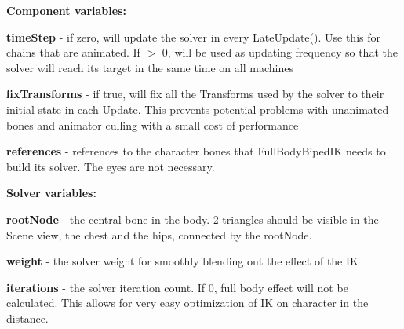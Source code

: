 {\bfseries Component variables\+:}
\begin{DoxyItemize}
\item {\bfseries time\+Step} -\/ if zero, will update the solver in every Late\+Update(). Use this for chains that are animated. If $>$ 0, will be used as updating frequency so that the solver will reach its target in the same time on all machines
\item {\bfseries fix\+Transforms} -\/ if true, will fix all the Transforms used by the solver to their initial state in each Update. This prevents potential problems with unanimated bones and animator culling with a small cost of performance
\item {\bfseries references} -\/ references to the character bones that Full\+Body\+Biped\+IK needs to build it\textquotesingle{}s solver. The eyes are not necessary.
\end{DoxyItemize}

{\bfseries Solver variables\+:}
\begin{DoxyItemize}
\item {\bfseries root\+Node} -\/ the central bone in the body. 2 triangles should be visible in the Scene view, the chest and the hips, connected by the root\+Node.
\item {\bfseries weight} -\/ the solver weight for smoothly blending out the effect of the IK
\item {\bfseries iterations} -\/ the solver iteration count. If 0, full body effect will not be calculated. This allows for very easy optimization of IK on character in the distance.
\end{DoxyItemize}

